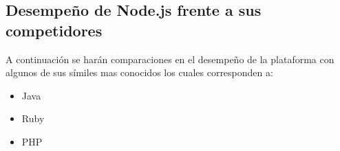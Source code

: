 %
%
%
%
%
%
%
%


\subsection{Desempeño de Node.js frente a sus competidores}
	A continuación se harán comparaciones en el desempeño de la plataforma  con algunos de sus símiles mas conocidos los cuales corresponden a:
	
	\begin{itemize}
		\item Java
		\item Ruby
		\item PHP
	\end{itemize}


